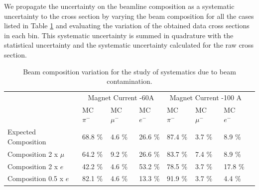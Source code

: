 We propagate the uncertainty on the beamline composition  as a systematic uncertainty to the cross section by varying the beam composition for all the cases listed in Table \ref{tab:beamlineSys} and evaluating the variation of the obtained  data cross sections in each bin. This systematic uncertainty is summed in quadrature with the statistical uncertainty and the systematic uncertainty calculated for the raw cross section.


\begin{table}[p]
\centering
\begin{tabular}{| l | l | l | l | l | l | l | l | }
\hline
 &  \multicolumn{3}{|c|}{Magnet Current -60A} & \multicolumn{3}{|c|}{Magnet Current -100 A}\\

                                                  & MC $\pi^-$   & MC  $ \mu^-$ & MC  $e^-$ & MC  $\pi^-$ & MC  $\mu^-$ & MC  $e^-$  \\
\hline
Expected Composition   & 68.8	\%&4.6 \%&	26.6 \%&	87.4 \%&	3.7	\%&8.9 \% \\
Composition 2 x $\mu$  & 64.2	\%&9.2 \%&	26.6 \%&	83.7 \%&	7.4	\%&8.9 \% \\
Composition 2 x $e$      &42.2	\%&4.6 \%&	53.2 \%&	78.5	\%&  3.7	\%&17.8 \%\\
Composition 0.5 x $e$   &82.1	\%&4.6 \%&	13.3 \%&	91.9 \%&	3.7	\%&4.4 \% \\
\hline
\end{tabular}
\caption{Beam composition variation for the study of systematics due to beam contamination.}
\label{tab:beamlineSys}
\end{table}

